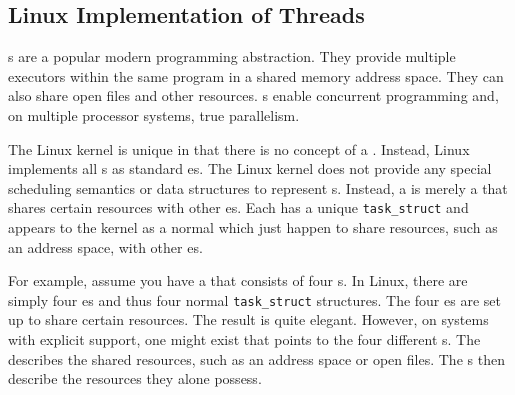 \subsection{Linux Implementation of Threads}\label{subsec:Linux_Implementation_Threads}
s are a popular modern programming abstraction.
They provide multiple executors within the same program in a shared memory address space.
They can also share open files and other resources.
s enable concurrent programming and, on multiple processor systems, true parallelism.

The Linux kernel is unique in that there is no concept of a .
Instead, Linux implements all s as standard es.
The Linux kernel does not provide any special scheduling semantics or data structures to represent s.
Instead, a  is merely a  that shares certain resources with other es.
Each  has a unique \texttt{task_struct} and appears to the kernel as a normal  which just happen to share resources, such as an address space, with other es.

For example, assume you have a  that consists of four s.
In Linux, there are simply four es and thus four normal \texttt{task_struct} structures.
The four es are set up to share certain resources.
The result is quite elegant.
However, on systems with explicit  support, one  might exist that points to the four different s.
The  describes the shared resources, such as an address space or open files.
The s then describe the resources they alone possess.


